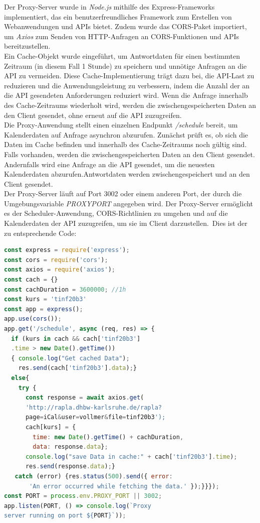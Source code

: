 Der Proxy-Server wurde in \emph{Node.js} mithilfe des Express-Frameworks implementiert, das ein benutzerfreundliches Framework zum Erstellen von Webanwendungen und APIs bietet. Zudem wurde das CORS-Paket importiert, um \emph{Axios} zum Senden von HTTP-Anfragen an CORS-Funktionen und APIs bereitzustellen.\\
Ein Cache-Objekt wurde eingeführt, um  Antwortdaten für einen bestimmten Zeitraum (in diesem Fall 1 Stunde) zu speichern und unnötige Anfragen an die API zu vermeiden. Diese Cache-Implementierung trägt dazu bei, die API-Last zu reduzieren und die Anwendungsleistung zu verbessern, indem  die Anzahl der an die API gesendeten Anforderungen reduziert wird. Wenn die Anfrage innerhalb des Cache-Zeitraums wiederholt wird, werden die zwischengespeicherten Daten an den Client gesendet, ohne erneut auf die API zuzugreifen.\\
Die Proxy-Anwendung stellt einen einzelnen Endpunkt \emph{/schedule} bereit, um Kalenderdaten auf Anfrage asynchron abzurufen. Zunächst prüft es, ob sich die Daten im Cache befinden und innerhalb des Cache-Zeitraums noch  gültig sind. Falls vorhanden, werden die zwischengespeicherten Daten an den Client gesendet. Andernfalls wird eine Anfrage an die API gesendet, um die neuesten Kalenderdaten abzurufen.Antwortdaten werden zwischengespeichert und an den Client gesendet.\\
Der Proxy-Server läuft auf Port 3002 oder einem anderen Port, der durch die Umgebungsvariable \emph{PROXYPORT} angegeben wird. Der Proxy-Server ermöglicht es der Scheduler-Anwendung, CORS-Richtlinien zu umgehen und auf die Kalenderdaten der API zuzugreifen, um sie im Client darzustellen.\
Dies ist der zu entsprechende Code:
\begin{lstlisting}[language=JavaScript,
	frame=single,           % Ein Rahmen um den Code
	framexleftmargin=15pt,  % Rahmen link von den Zahlen
	style=algoBericht,
	label={Proxy-Server},
	captionpos=b ,          % Caption unter den Code setzen
	caption={Proxy-Server}]
const express = require('express');
const cors = require('cors');
const axios = require('axios');
const cach = {}
const cachDuration = 3600000; //1h
const kurs = 'tinf20b3'
const app = express();
app.use(cors());
app.get('/schedule', async (req, res) => {
  if (kurs in cach && cach['tinf20b3']
  .time > new Date().getTime())
  { console.log("Get cached Data");
  	res.send(cach['tinf20b3'].data);}
  else{
    try {
      const response = await axios.get(
      'http://rapla.dhbw-karlsruhe.de/rapla?
      page=iCal&user=vollmer&file=tinf20b3');
      cach[kurs] = {
      	time: new Date().getTime() + cachDuration,
      	data: response.data};
      console.log("save Data in cache:" + cach['tinf20b3'].time);
      res.send(response.data);} 
   catch (error) {res.status(500).send({ error: 
   	   'An error occurred while fetching the data.' });}}});
const PORT = process.env.PROXY_PORT || 3002;
app.listen(PORT, () => console.log(`Proxy 
server running on port ${PORT}`));

\end{lstlisting}
